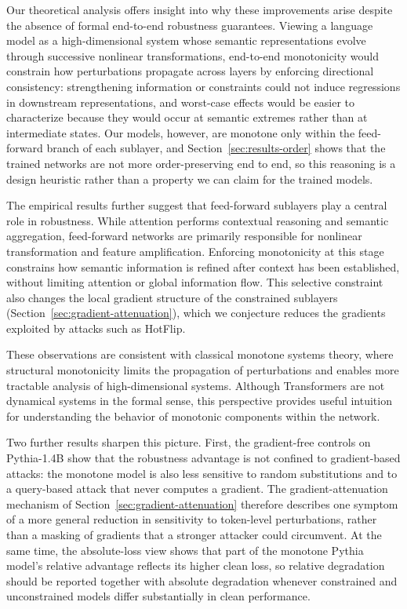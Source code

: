 \documentclass{article}
\theoremstyle{plain}
\theoremstyle{definition}
\theoremstyle{remark}
\begin{document}
Our theoretical analysis offers insight into why these improvements arise despite the absence of formal end-to-end robustness guarantees. Viewing a language model as a high-dimensional system whose semantic representations evolve through successive nonlinear transformations, end-to-end monotonicity would constrain how perturbations propagate across layers by enforcing directional consistency: strengthening information or constraints could not induce regressions in downstream representations, and worst-case effects would be easier to characterize because they would occur at semantic extremes rather than at intermediate states. Our models, however, are monotone only within the feed-forward branch of each sublayer, and Section~\ref{sec:results-order} shows that the trained networks are not more order-preserving end to end, so this reasoning is a design heuristic rather than a property we can claim for the trained models.

The empirical results further suggest that feed-forward sublayers play a central role in robustness. While attention performs contextual reasoning and semantic aggregation, feed-forward networks are primarily responsible for nonlinear transformation and feature amplification. Enforcing monotonicity at this stage constrains how semantic information is refined after context has been established, without limiting attention or global information flow. This selective constraint also changes the local gradient structure of the constrained sublayers (Section~\ref{sec:gradient-attenuation}), which we conjecture reduces the gradients exploited by attacks such as HotFlip.

These observations are consistent with classical monotone systems theory, where structural monotonicity limits the propagation of perturbations and enables more tractable analysis of high-dimensional systems. Although Transformers are not dynamical systems in the formal sense, this perspective provides useful intuition for understanding the behavior of monotonic components within the network.

Two further results sharpen this picture. First, the gradient-free controls on Pythia-1.4B show that the robustness advantage is not confined to gradient-based attacks: the monotone model is also less sensitive to random substitutions and to a query-based attack that never computes a gradient. The gradient-attenuation mechanism of Section~\ref{sec:gradient-attenuation} therefore describes one symptom of a more general reduction in sensitivity to token-level perturbations, rather than a masking of gradients that a stronger attacker could circumvent. At the same time, the absolute-loss view shows that part of the monotone Pythia model's relative advantage reflects its higher clean loss, so relative degradation should be reported together with absolute degradation whenever constrained and unconstrained models differ substantially in clean performance.
\end{document}

